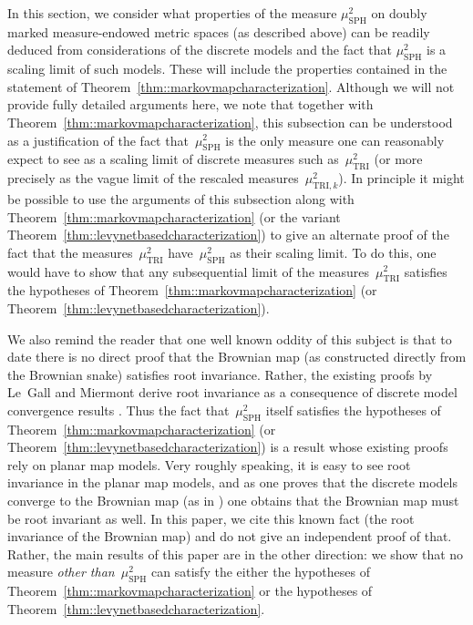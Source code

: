 \documentclass[JEP,XML,SOM,Unicode]{cedram}
\theoremstyle{plain}
\numberwithin{theorem}{section}
\theoremstyle{definition}
\newcommand{\mustwo}{\mu_{\mathrm{SPH}}^2}
\begin{document}
In this section, we consider what properties of the measure $\mustwo$ on doubly marked measure-endowed metric spaces (as described above) can be readily deduced from considerations of the discrete models and the fact that $\mustwo$ is a scaling limit of such models. These will include the properties contained in the statement of Theorem~\ref {thm::markovmapcharacterization}. Although we will not provide fully detailed arguments here, we note that together with Theorem~\ref {thm::markovmapcharacterization}, this subsection can be understood as a justification of the fact that~$\mustwo$ is the only measure one can reasonably expect to see as a scaling limit of discrete measures such as~$\mu^2_{\mathrm{TRI}}$ (or more precisely as the vague limit of the rescaled measures~$\mu^2_{\mathrm{TRI},k}$). In principle it might be possible to use the arguments of this subsection along with Theorem~\ref {thm::markovmapcharacterization} (or the variant Theorem~\ref{thm::levynetbasedcharacterization}) to give an alternate proof of the fact that the measures~$\mu^2_{\mathrm{TRI}}$ have~$\mustwo$ as their scaling limit. To do this, one would have to show that any subsequential limit of the measures~$\mu^2_{\mathrm{TRI}}$ satisfies the hypotheses of Theorem~\ref {thm::markovmapcharacterization} (or Theorem~\ref{thm::levynetbasedcharacterization}).

We also remind the reader that one well known oddity of this subject is that to date there is no direct proof that the Brownian map (as constructed directly from the Brownian snake) satisfies root invariance. Rather, the existing proofs by Le~Gall and Miermont derive root invariance as a consequence of discrete model convergence results \cite{legallgeodesics, legalluniqueanduniversal, miermontlimit, legalluniversallimit}. Thus the fact that~$\mustwo$ itself satisfies the hypotheses of Theorem~\ref {thm::markovmapcharacterization} (or Theorem~\ref{thm::levynetbasedcharacterization}) is a result whose existing proofs rely on planar map models. Very roughly speaking, it is easy to see root invariance in the planar map models, and as one proves that the discrete models converge to the Brownian map (as in \cite{legalluniqueanduniversal, miermontlimit, legalluniversallimit}) one obtains that the Brownian map must be root invariant as well. In this paper, we cite this known fact (the root invariance of the Brownian map) and do not give an independent proof of that. Rather, the main results of this paper are in the other direction: we show that no measure \emph{other than}~$\mustwo$ can satisfy the either the hypotheses of Theorem~\ref {thm::markovmapcharacterization} or the hypotheses of Theorem~\ref{thm::levynetbasedcharacterization}.
\end{document}

